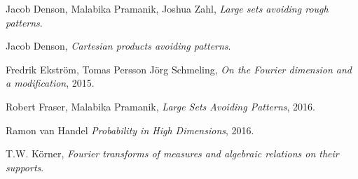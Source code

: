 \documentclass[12pt,reqno]{article}
\numberwithin{equation}{section}
\numberwithin{theorem}{section}
\begin{document}
\begin{thebibliography}{9}

    Jacob Denson, Malabika Pramanik, Joshua Zahl,
    \textit{Large sets avoiding rough patterns}.

    Jacob Denson,
    \textit{Cartesian products avoiding patterns}.

    Fredrik Ekstr\"{o}m, Tomas Persson J\"{o}rg Schmeling,
    \textit{On the Fourier dimension and a modification},
    2015.

    Robert Fraser, Malabika Pramanik,
    \textit{Large Sets Avoiding Patterns},
    2016.

    Ramon van Handel
    \textit{Probability in High Dimensions},
    2016.


    T.W. K\"{o}rner,
    \textit{Fourier transforms of measures and algebraic relations on their supports}.


\end{thebibliography}
\end{document}
